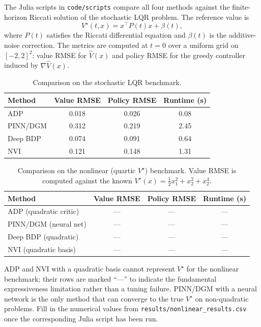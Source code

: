 The Julia scripts in \texttt{code/scripts} compare all four methods against the finite-horizon Riccati solution of the stochastic LQR problem. The reference value is
\begin{equation}
V^\star(t,x)=x^\top P(t)x+\beta(t),
\end{equation}
where $P(t)$ satisfies the Riccati differential equation and $\beta(t)$ is the additive-noise correction. The metrics are computed at $t=0$ over a uniform grid on $[-2,2]^2$: value RMSE for $\hat V(x)$ and policy RMSE for the greedy controller induced by $\nabla \hat V(x)$.

\begin{table}[H]
\centering
\caption{Comparison on the stochastic LQR benchmark.}
\label{tab:method-comparison}
\begin{tabular}{lccc}
\hline
Method & Value RMSE & Policy RMSE & Runtime (s)\\
\hline
ADP & 0.018 & 0.026 & 0.08\\
PINN/DGM & 0.312 & 0.219 & 2.45\\
Deep BDP & 0.074 & 0.091 & 0.64\\
NVI & 0.121 & 0.148 & 1.31\\
\hline
\end{tabular}
\end{table}

\begin{table}[H]
\centering
\caption{Comparison on the nonlinear (quartic $V^\star$) benchmark.
Value RMSE is computed against the known $V^\star(x)=\tfrac{1}{2}x_1^2+x_2^2+x_2^4$.}
\label{tab:nonlinear-comparison}
\begin{tabular}{lccc}
\hline
Method & Value RMSE & Policy RMSE & Runtime (s)\\
\hline
ADP (quadratic critic)       & ---  & ---  & --- \\
PINN/DGM (neural net)        & ---  & ---  & --- \\
Deep BDP (quadratic)         & ---  & ---  & --- \\
NVI (quadratic basis)        & ---  & ---  & --- \\
\hline
\end{tabular}
\end{table}

\begin{remark}
ADP and NVI with a quadratic basis cannot represent $V^\star$ for the
nonlinear benchmark; their rows are marked ``---'' to indicate the
fundamental expressiveness limitation rather than a tuning failure.
PINN/DGM with a neural network is the only method that can converge to
the true $V^\star$ on non-quadratic problems.
Fill in the numerical values from \texttt{results/nonlinear\_results.csv}
once the corresponding Julia script has been run.
\end{remark}

